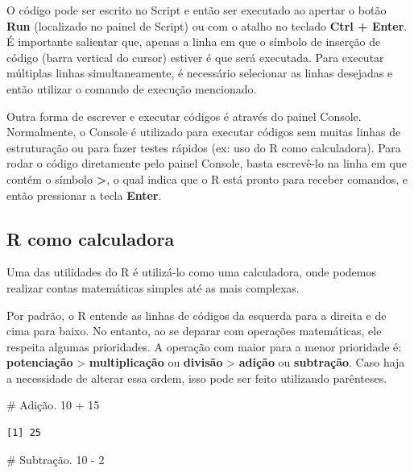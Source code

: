 \documentclass[
  letterpaper,
  DIV=11,
  numbers=noendperiod]{scrreprt}
\newenvironment{Shaded}{\begin{snugshade}}{\end{snugshade}}
\newcommand{\CommentTok}[1]{\textcolor[rgb]{0.37,0.37,0.37}{#1}}
\newcommand{\DecValTok}[1]{\textcolor[rgb]{0.68,0.00,0.00}{#1}}
\newcommand{\SpecialCharTok}[1]{\textcolor[rgb]{0.37,0.37,0.37}{#1}}
\begin{document}
O código pode ser escrito no Script e então ser executado ao apertar o
botão \textbf{Run} (localizado no painel de Script) ou com o atalho no
teclado \textbf{Ctrl + Enter}. É importante salientar que, apenas a
linha em que o símbolo de inserção de código (barra vertical do cursor)
estiver é que será executada. Para executar múltiplas linhas
simultaneamente, é necessário selecionar as linhas desejadas e então
utilizar o comando de execução mencionado.

Outra forma de escrever e executar códigos é através do painel Console.
Normalmente, o Console é utilizado para executar códigos sem muitas
linhas de estruturação ou para fazer testes rápidos (ex: uso do R como
calculadora). Para rodar o código diretamente pelo painel Console, basta
escrevê-lo na linha em que contém o símbolo \textbf{\textgreater{}}, o
qual indica que o R está pronto para receber comandos, e então
pressionar a tecla \textbf{Enter}.

\hypertarget{r-como-calculadora}{%
\subsection{R como calculadora}\label{r-como-calculadora}}

Uma das utilidades do R é utilizá-lo como uma calculadora, onde podemos
realizar contas matemáticas simples até as mais complexas.

Por padrão, o R entende as linhas de códigos da esquerda para a direita
e de cima para baixo. No entanto, ao se deparar com operações
matemáticas, ele respeita algumas prioridades. A operação com maior para
a menor prioridade é: \textbf{potenciação} \textgreater{}
\textbf{multiplicação} ou \textbf{divisão} \textgreater{}
\textbf{adição} ou \textbf{subtração}. Caso haja a necessidade de
alterar essa ordem, isso pode ser feito utilizando parênteses.

\begin{Shaded}
\begin{Highlighting}[]
\CommentTok{\# Adição.}
\DecValTok{10} \SpecialCharTok{+} \DecValTok{15}
\end{Highlighting}
\end{Shaded}

\begin{verbatim}
[1] 25
\end{verbatim}

\begin{Shaded}
\begin{Highlighting}[]
\CommentTok{\# Subtração.}
\DecValTok{10} \SpecialCharTok{{-}} \DecValTok{2}
\end{Highlighting}
\end{Shaded}
\end{document}
